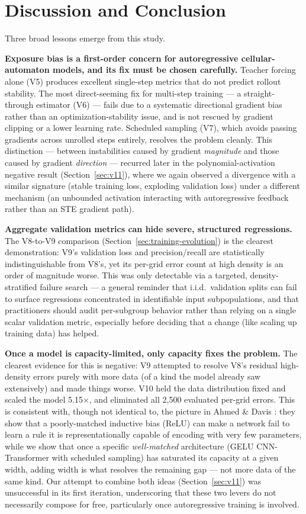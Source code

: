 \section{Discussion and Conclusion}

Three broad lessons emerge from this study.

\textbf{Exposure bias is a first-order concern for autoregressive
cellular-automaton models, and its fix must be chosen carefully.} Teacher
forcing alone (V5) produces excellent single-step metrics that do not
predict rollout stability. The most direct-seeming fix for multi-step
training --- a straight-through estimator (V6) --- fails due to a
systematic directional gradient bias rather than an optimization-stability
issue, and is not rescued by gradient clipping or a lower learning rate.
Scheduled sampling (V7), which avoids passing gradients across unrolled
steps entirely, resolves the problem cleanly. This distinction --- between
instabilities caused by gradient \emph{magnitude} and those caused by
gradient \emph{direction} --- recurred later in the polynomial-activation
negative result (Section~\ref{sec:v11}), where we again observed a
divergence with a similar signature (stable training loss, exploding
validation loss) under a different mechanism (an unbounded activation
interacting with autoregressive feedback rather than an STE gradient path).

\textbf{Aggregate validation metrics can hide severe, structured
regressions.} The V8-to-V9 comparison (Section~\ref{sec:training-evolution})
is the clearest demonstration: V9's validation loss and precision/recall
are statistically indistinguishable from V8's, yet its per-grid error count
at high density is an order of magnitude worse. This was only detectable
via a targeted, density-stratified failure search --- a general reminder
that i.i.d.\ validation splits can fail to surface regressions concentrated
in identifiable input subpopulations, and that practitioners should audit
per-subgroup behavior rather than relying on a single scalar validation
metric, especially before deciding that a change (like scaling up training
data) has helped.

\textbf{Once a model is capacity-limited, only capacity fixes the problem.}
The clearest evidence for this is negative: V9 attempted to resolve V8's
residual high-density errors purely with more data (of a kind the model
already saw extensively) and made things worse. V10 held the data
distribution fixed and scaled the model 5.15$\times$, and eliminated all
2,500 evaluated per-grid errors. This is consistent with, though not
identical to, the picture in Ahmed \& Davis \cite{ahmed2026polynomial}: they
show that a poorly-matched inductive bias (ReLU) can make a
network fail to learn a rule it is representationally capable of encoding
with very few parameters, while we show that once a specific
\emph{well-matched} architecture (GELU CNN-Transformer with scheduled
sampling) has saturated its capacity at a given width, adding width is what
resolves the remaining gap --- not more data of the same kind. Our
attempt to combine both ideas (Section~\ref{sec:v11}) was unsuccessful in
its first iteration, underscoring that these two levers do not necessarily
compose for free, particularly once autoregressive training is involved.


